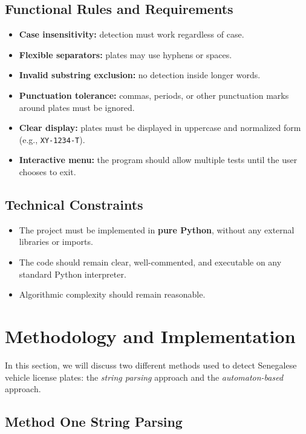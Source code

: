 \documentclass[12pt,a4paper]{article}
\begin{document}
\subsection{Functional Rules and Requirements}
\begin{itemize}
    \item \textbf{Case insensitivity:} detection must work regardless of case.
    \item \textbf{Flexible separators:} plates may use hyphens or spaces.
    \item \textbf{Invalid substring exclusion:} no detection inside longer words.
    \item \textbf{Punctuation tolerance:} commas, periods, or other punctuation marks around plates must be ignored.
    \item \textbf{Clear display:} plates must be displayed in uppercase and normalized form (e.g., \texttt{XY-1234-T}).
    \item \textbf{Interactive menu:} the program should allow multiple tests until the user chooses to exit.
\end{itemize}

\subsection{Technical Constraints}
\begin{itemize}
    \item The project must be implemented in \textbf{pure Python}, without any external libraries or imports.
    \item The code should remain clear, well-commented, and executable on any standard Python interpreter.
    \item Algorithmic complexity should remain reasonable.

\end{itemize}

\section{Methodology and Implementation}

In this section, we will discuss two different methods used to detect Senegalese vehicle license plates: 
the \textit{string parsing} approach and the \textit{automaton-based} approach. 


\subsection{Method One  String Parsing}
\end{document}
